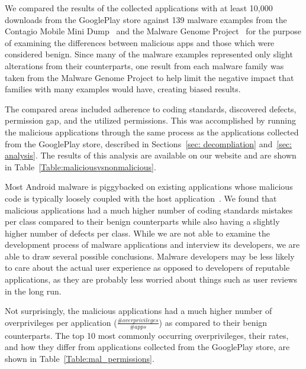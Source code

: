 \documentclass[conference]{IEEEtran}
\begin{document}
We compared the results of the collected applications with at least 10,000 downloads from the GooglePlay store against 139 malware examples from the Contagio Mobile Mini Dump~\cite{contagio_url} and the Malware Genome Project~\cite{Zhou:2012:DAM:2310656.2310710} for the purpose of examining the differences between malicious apps and those which were considered benign. Since many of the malware examples represented only slight alterations from their counterparts, one result from each malware family was taken from the Malware Genome Project to help limit the negative impact that families with many examples would have, creating biased results.

The compared areas included adherence to coding standards, discovered defects, permission gap, and the utilized permissions. This was accomplished by running the malicious applications through the same process as the applications collected from the GooglePlay store, described in Sections~\ref{sec: decompliation} and~\ref{sec: analysis}. The results of this analysis are available on our website and are shown in Table~\ref{Table:maliciousvsnonmalicious}.

Most Android malware is piggybacked on existing applications whose malicious code is typically loosely coupled with the host application~\cite{Zhou:2012:DAM:2310656.2310710, Deshotels:2014:DAF:2556464.2556467}. We found that malicious applications had a much higher number of coding standards mistakes per class compared to their benign counterparts while also having a slightly higher number of defects per class. While we are not able to examine the development process of malware applications and interview its developers, we are able to draw several possible conclusions. Malware developers may be less likely to care about the actual user experience as opposed to developers of reputable applications, as they are probably less worried about things such as user reviews in the long run.


Not surprisingly, the malicious applications had a much higher number of overprivileges per application ($\frac{\#overprivileges}{\# apps} $) as compared to their benign counterparts. The top 10 most commonly occurring overprivileges, their rates, and how they differ from applications collected from the GooglePlay store, are shown in Table~\ref{Table:mal_permissions}.
\end{document}
